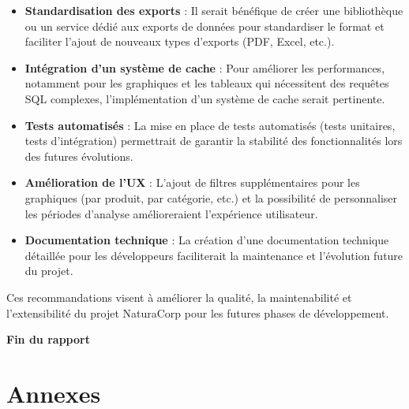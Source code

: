 \documentclass[a4paper,12pt]{report}
\begin{document}
  \begin{itemize}
    \item \textbf{Standardisation des exports} : Il serait bénéfique de créer une bibliothèque ou un service dédié aux exports de données pour standardiser le format et faciliter l'ajout de nouveaux types d'exports (PDF, Excel, etc.).
    
    \item \textbf{Intégration d'un système de cache} : Pour améliorer les performances, notamment pour les graphiques et les tableaux qui nécessitent des requêtes SQL complexes, l'implémentation d'un système de cache serait pertinente.
    
    \item \textbf{Tests automatisés} : La mise en place de tests automatisés (tests unitaires, tests d'intégration) permettrait de garantir la stabilité des fonctionnalités lors des futures évolutions.
    
    \item \textbf{Amélioration de l'UX} : L'ajout de filtres supplémentaires pour les graphiques (par produit, par catégorie, etc.) et la possibilité de personnaliser les périodes d'analyse amélioreraient l'expérience utilisateur.
    
    \item \textbf{Documentation technique} : La création d'une documentation technique détaillée pour les développeurs faciliterait la maintenance et l'évolution future du projet.
  \end{itemize}
  
  Ces recommandations visent à améliorer la qualité, la maintenabilité et l'extensibilité du projet NaturaCorp pour les futures phases de développement.
  
  \vspace{1cm}
  \begin{center}
    \textbf{Fin du rapport}
  \end{center}

\newpage
\section{Annexes}
\end{document}

